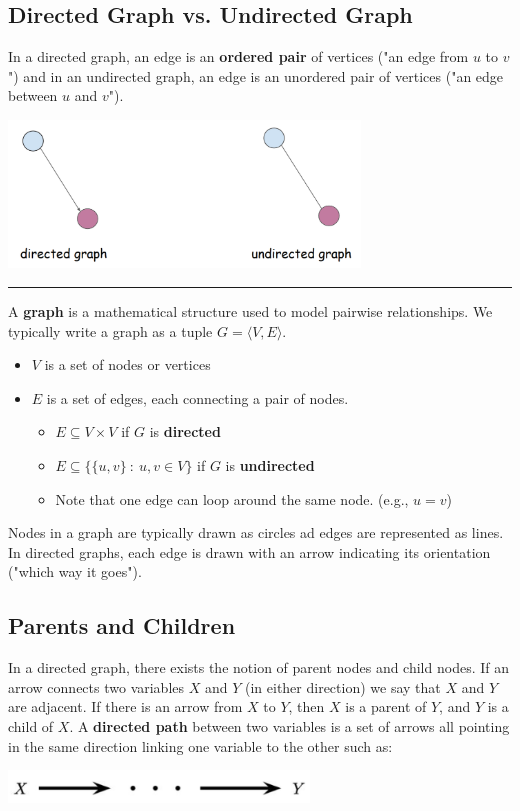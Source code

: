 \documentclass[10pt]{article}
\begin{document}
\subsection*{Directed Graph vs. Undirected Graph}
In a directed graph, an edge is an \textbf{ordered pair} of vertices ("an edge from $u$ to $v$") and in an undirected graph, an edge is an unordered pair of vertices ("an edge between $u$ and $v$").
\begin{center} 
	\includegraphics*[width=0.7\textwidth]{M4_1.png} 
\end{center}
\rule{\textwidth}{0.4pt}
\par
\pagebreak
A \textbf{graph} is a mathematical structure used to model pairwise relationships.  We typically write a graph as a tuple $G = \langle V, E \rangle$.
\begin{itemize}
	\item $V$ is a set of nodes or vertices
	\item $E$ is a set of edges, each connecting a pair of nodes.
	\begin{itemize}
	    \item $E \subseteq V \times V$ if $G$ is \textbf{directed}
	    \item $E \subseteq \{\{u, v\} \::\: u, v \in V\}$ if $G$ is \textbf{undirected}
	    \item Note that one edge can loop around the same node.  (e.g., $u = v$)
    \end{itemize}
\end{itemize}
Nodes in a graph are typically drawn as circles ad edges are represented as lines.  In directed graphs, each edge is drawn with an arrow indicating its orientation ("which way it goes").

\subsection*{Parents and Children}
In a directed graph, there exists the notion of parent nodes and child nodes.  If an arrow connects two variables $X$ and $Y$ (in either direction) we say that $X$ and $Y$ are adjacent.  If there is an arrow from $X$ to $Y$, then $X$ is a parent of $Y$, and $Y$ is a child of $X$.  A \textbf{directed path} between two variables is a set of arrows all pointing in the same direction linking one variable to the other such as:
\begin{center} 
	\includegraphics[width=0.6\textwidth]{M4_2.png}
\end{center}
\end{document}
